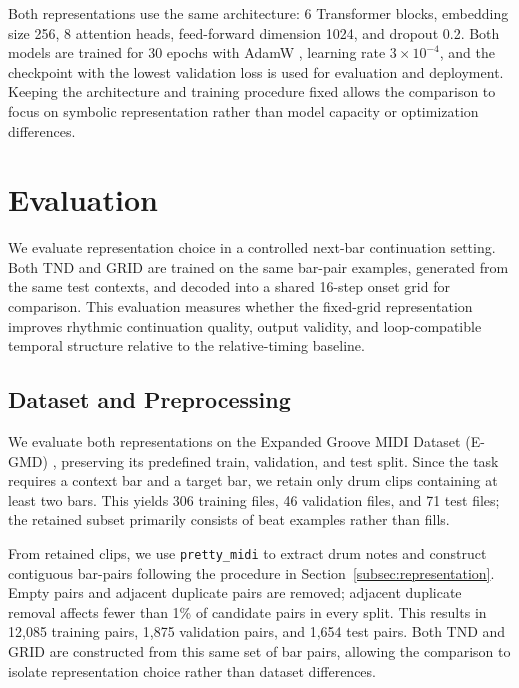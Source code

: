 \documentclass{article}
\begin{document}
Both representations use the same architecture: 6 Transformer blocks, embedding size 256, 8 attention heads, feed-forward dimension 1024, and dropout 0.2. Both models are trained for 30 epochs with AdamW \cite{loshchilov2017decoupled}, learning rate $3\times10^{-4}$, and the checkpoint with the lowest validation loss is used for evaluation and deployment. Keeping the architecture and training procedure fixed allows the comparison to focus on symbolic representation rather than model capacity or optimization differences.





\section{Evaluation}\label{sec:evaluation}
We evaluate representation choice in a controlled next-bar continuation setting. Both TND and GRID are trained on the same bar-pair examples, generated from the same test contexts, and decoded into a shared 16-step onset grid for comparison. This evaluation measures whether the fixed-grid representation improves rhythmic continuation quality, output validity, and loop-compatible temporal structure relative to the relative-timing baseline.


\subsection{Dataset and Preprocessing}\label{subsec:dataset_eval_setup}
We evaluate both representations on the Expanded Groove MIDI Dataset (E-GMD) \cite{callender2020improving}, preserving its predefined train, validation, and test split. Since the task requires a context bar and a target bar, we retain only drum clips containing at least two bars. This yields 306 training files, 46 validation files, and 71 test files; the retained subset primarily consists of beat examples rather than fills.

From retained clips, we use \texttt{pretty\_midi} \cite{raffel2014intuitive} to extract drum notes and construct contiguous bar-pairs following the procedure in Section~\ref{subsec:representation}. Empty pairs and adjacent duplicate pairs are removed; adjacent duplicate removal affects fewer than 1\% of candidate pairs in every split. This results in 12,085 training pairs, 1,875 validation pairs, and 1,654 test pairs. Both TND and GRID are constructed from this same set of bar pairs, allowing the comparison to isolate representation choice rather than dataset differences.
\end{document}
